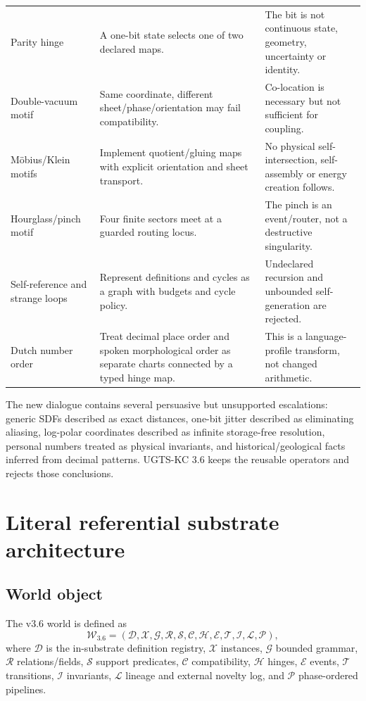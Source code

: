\documentclass[10pt,a4paper]{article}
\begin{document}
\begin{longtable}{>{\raggedright\arraybackslash}p{3.3cm}>{\raggedright\arraybackslash}p{6.0cm}>{\raggedright\arraybackslash}p{6.2cm}}
Parity hinge & A one-bit state selects one of two declared maps. & The bit is not continuous state, geometry, uncertainty or identity. \\
Double-vacuum motif & Same coordinate, different sheet/phase/orientation may fail compatibility. & Co-location is necessary but not sufficient for coupling. \\
Möbius/Klein motifs & Implement quotient/gluing maps with explicit orientation and sheet transport. & No physical self-intersection, self-assembly or energy creation follows. \\
Hourglass/pinch motif & Four finite sectors meet at a guarded routing locus. & The pinch is an event/router, not a destructive singularity. \\
Self-reference and strange loops & Represent definitions and cycles as a graph with budgets and cycle policy. & Undeclared recursion and unbounded self-generation are rejected. \\
Dutch number order & Treat decimal place order and spoken morphological order as separate charts connected by a typed hinge map. & This is a language-profile transform, not changed arithmetic. \\
\bottomrule
\end{longtable}

\begin{correctionbox}
The new dialogue contains several persuasive but unsupported escalations: generic SDFs described as exact distances, one-bit jitter described as eliminating aliasing, log-polar coordinates described as infinite storage-free resolution, personal numbers treated as physical invariants, and historical/geological facts inferred from decimal patterns. UGTS-KC 3.6 keeps the reusable operators and rejects those conclusions.
\end{correctionbox}

\section{Literal referential substrate architecture}

\subsection{World object}
The v3.6 world is defined as
\[
\mathcal{W}_{3.6}=(\mathcal{D},\mathcal{X},\mathcal{G},\mathcal{R},\mathcal{S},\mathcal{C},\mathcal{H},\mathcal{E},\mathcal{T},\mathcal{I},\mathcal{L},\mathcal{P}),
\]
where $\mathcal{D}$ is the in-substrate definition registry, $\mathcal{X}$ instances, $\mathcal{G}$ bounded grammar, $\mathcal{R}$ relations/fields, $\mathcal{S}$ support predicates, $\mathcal{C}$ compatibility, $\mathcal{H}$ hinges, $\mathcal{E}$ events, $\mathcal{T}$ transitions, $\mathcal{I}$ invariants, $\mathcal{L}$ lineage and external novelty log, and $\mathcal{P}$ phase-ordered pipelines.
\end{document}
